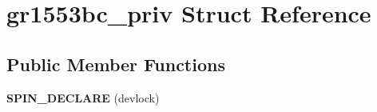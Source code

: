 \hypertarget{structgr1553bc__priv}{}\section{gr1553bc\+\_\+priv Struct Reference}
\label{structgr1553bc__priv}
\subsection*{Public Member Functions}
\begin{DoxyCompactItemize}
\item 
\mbox{\label{structgr1553bc__priv_a2c30c826e9f1a5904cf83dc654fc7ce5}} 
{\bfseries S\+P\+I\+N\+\_\+\+D\+E\+C\+L\+A\+RE} (devlock)
\end{DoxyCompactItemize}
